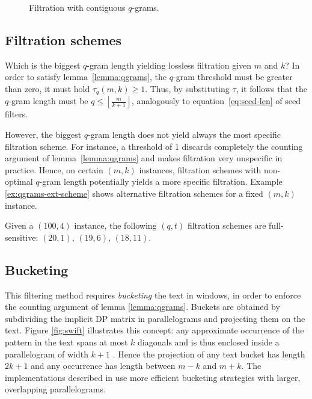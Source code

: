 \begin{figure}[h]
\begin{center}
\caption[Filtration with contiguous $q$-grams]{Filtration with contiguous $q$-grams.}
\label{fig:qgrams-ext}

\end{center}
\end{figure}

\subsection{Filtration schemes}

Which is the biggest $q$-gram length yielding lossless filtration given $m$ and $k$?
In order to satisfy lemma~\ref{lemma:qgrams}, the $q$-gram threshold must be greater than zero, \ie it must hold $\tau_q(m,k) \geq 1$.
Thus, by substituting $\tau$, it follows that the $q$-gram length must be $q \leq \left \lfloor \frac{m}{k+1} \right \rfloor$, analogously to equation~\ref{eq:seed-len} of seed filters.

However, the biggest $q$-gram length does not yield always the most specific filtration scheme.
For instance, a threshold of 1 discards completely the counting argument of lemma~\ref{lemma:qgrams} and makes filtration very unspecific in practice.
Hence, on certain $(m,k)$ instances, filtration schemes with non-optimal $q$-gram length potentially yields a more specific filtration.
Example \ref{ex:qgrams-ext-scheme} shows alternative filtration schemes for a fixed $(m,k)$ instance.

\begin{example}
\label{ex:qgrams-ext-scheme}
Given a $(100,4)$ instance, the following $(q,t)$ filtration schemes are full-sensitive:
$(20,1)$, $(19,6)$, $(18,11)$.
\end{example}

\subsection{Bucketing}

This filtering method requires \emph{bucketing} the text in windows, in order to enforce the counting argument of lemma \ref{lemma:qgrams}.
Buckets are obtained by subdividing the implicit DP matrix in parallelograms and projecting them on the text.
Figure \ref{fig:swift} illustrates this concept: any approximate occurrence of the pattern in the text spans at most $k$ diagonals and is thus enclosed inside a parallelogram of width $k+1$ \citep{Rasmussen2006}.
Hence the projection of any text bucket has length $2k + 1$ and any occurrence has length between $m - k$ and $m + k$.
The implementations described in \citep{Rasmussen2006, Kehr2011, Weese2009} use more efficient bucketing strategies with larger, overlapping parallelograms.

